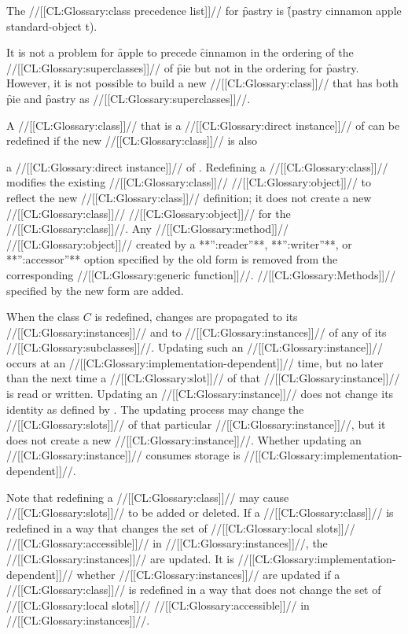 The //[[CL:Glossary:class precedence list]]// for \f{pastry} is   \f{(pastry cinnamon apple standard-object t)}.

It is not a problem for \f{apple} to precede \f{cinnamon} in the ordering of the //[[CL:Glossary:superclasses]]// of \f{pie} but not in the ordering for \f{pastry}.  However, it is not possible to build a new //[[CL:Glossary:class]]// that has both \f{pie} and \f{pastry} as //[[CL:Glossary:superclasses]]//.

\endsubsubsection%

\endsubSection%
                                

A //[[CL:Glossary:class]]// that is a //[[CL:Glossary:direct instance]]// of  can be redefined if the new //[[CL:Glossary:class]]// is also

a //[[CL:Glossary:direct instance]]// of . Redefining a //[[CL:Glossary:class]]// modifies the existing //[[CL:Glossary:class]]// //[[CL:Glossary:object]]// to reflect the new //[[CL:Glossary:class]]// definition; it does not create a new //[[CL:Glossary:class]]// //[[CL:Glossary:object]]// for the //[[CL:Glossary:class]]//.   Any //[[CL:Glossary:method]]// //[[CL:Glossary:object]]// created by a **'':reader''**, **'':writer''**,  or **'':accessor''** option specified by the old  form is removed from the corresponding //[[CL:Glossary:generic function]]//. //[[CL:Glossary:Methods]]// specified by the new  form are added.

When the class $C$ is redefined, changes are propagated to its //[[CL:Glossary:instances]]// and to //[[CL:Glossary:instances]]// of any of its //[[CL:Glossary:subclasses]]//.  Updating such an //[[CL:Glossary:instance]]// occurs at an //[[CL:Glossary:implementation-dependent]]// time, but no later than the next time a //[[CL:Glossary:slot]]//  of that //[[CL:Glossary:instance]]// is read or written.  Updating an //[[CL:Glossary:instance]]//  does not change its identity as defined by . The updating process may change the //[[CL:Glossary:slots]]// of that particular //[[CL:Glossary:instance]]//,  but it does not create a new //[[CL:Glossary:instance]]//.  Whether updating an //[[CL:Glossary:instance]]// consumes storage is //[[CL:Glossary:implementation-dependent]]//.

Note that redefining a //[[CL:Glossary:class]]// may cause //[[CL:Glossary:slots]]// to be added or  deleted.  If a //[[CL:Glossary:class]]// is redefined in a way that changes the set of //[[CL:Glossary:local slots]]// //[[CL:Glossary:accessible]]// in //[[CL:Glossary:instances]]//, the //[[CL:Glossary:instances]]//  are updated.  It is //[[CL:Glossary:implementation-dependent]]// whether //[[CL:Glossary:instances]]//  are updated if a //[[CL:Glossary:class]]// is redefined in a way that does not change  the set of //[[CL:Glossary:local slots]]// //[[CL:Glossary:accessible]]// in //[[CL:Glossary:instances]]//.

